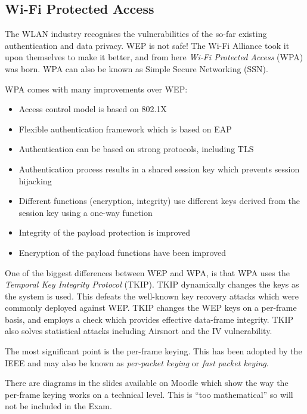 \subsection{Wi-Fi Protected Access}
The WLAN industry recognises the vulnerabilities of the so-far existing authentication and data privacy. WEP is not safe! The Wi-Fi Alliance took it upon themselves to make it better, and from here \textit{Wi-Fi Protected Access} (WPA) was born. WPA can also be known as Simple Secure Networking (SSN).

WPA comes with many improvements over WEP:
\begin{itemize}
    \item Access control model is based on 802.1X
    \item Flexible authentication framework which is based on EAP
    \item Authentication can be based on strong protocols, including TLS
    \item Authentication process results in a shared session key which prevents session hijacking
    \item Different functions (encryption, integrity) use different keys derived from the session key using a one-way function
    \item Integrity of the payload protection is improved
    \item Encryption of the payload functions have been improved
\end{itemize}

One of the biggest differences between WEP and WPA, is that WPA uses the \textit{Temporal Key Integrity Protocol} (TKIP). TKIP dynamically changes the keys as the system is used. This defeats the well-known key recovery attacks which were commonly deployed against WEP. TKIP changes the WEP keys on a per-frame basis, and employs a check which provides effective data-frame integrity. TKIP also solves statistical attacks including Airsnort and the IV vulnerability. 

The most significant point is the per-frame keying. This has been adopted by the IEEE and may also be known as \textit{per-packet keying} or \textit{fast packet keying}. 

\begin{extlink}
There are diagrams in the slides available on Moodle which show the way the per-frame keying works on a technical level. This is ``too mathematical'' so will not be included in the Exam.
\end{extlink}

